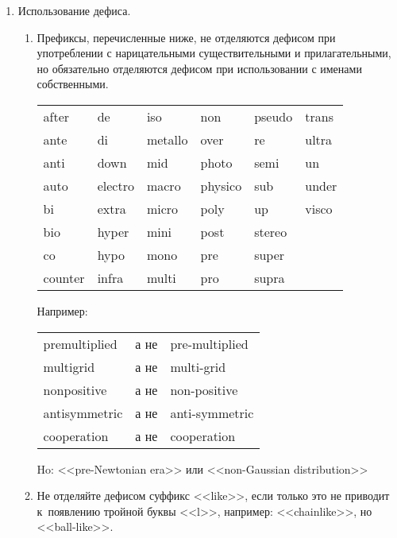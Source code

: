 \documentclass[a5paper, 10pt, twoside, numbers=enddot]{scrartcl}
\begin{document}
\begin{enumerate}
  \item Использование дефиса.
    \begin{enumerate}
      \item Префиксы, перечисленные ниже, не отделяются дефисом при употреблении с нарицательными
        существительными и прилагательными, но обязательно отделяются дефисом при использовании с
        именами собственными.
        \begin{center}
          \sffamily
          \begin{tabular}{llllll}
            after    & de       & iso      & non      & pseudo  & trans\\
            ante     & di       & metallo  & over     & re      & ultra\\
            anti     & down     & mid      & photo    & semi    & un\\
            auto     & electro  & macro    & physico  & sub     & under\\
            bi       & extra    & micro    & poly     & up      & visco\\
            bio      & hyper    & mini     & post     & stereo  &\\
            co       & hypo     & mono     & pre      & super   &\\
            counter  & infra    & multi    & pro      & supra   &\\
          \end{tabular}
        \end{center}
        Например:
        \begin{center}
          \sffamily
          \begin{tabular}{lll}
            premultiplied  & а не & pre-multiplied\\
            multigrid      & а не & multi-grid\\
            nonpositive    & а не & non-positive\\
            antisymmetric  & а не & anti-symmetric\\
            cooperation    & а не & cooperation
          \end{tabular}
        \end{center}
        Ho: <<pre-Newtonian era>> или <<non-Gaussian distribution>>

      \item Не отделяйте дефисом суффикс <<like>>, если только это не приводит к~появлению тройной
        буквы <<l>>, например: <<chainlike>>, но <<ball-like>>.


\end{enumerate}
\end{enumerate}
\end{document}
